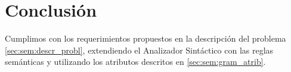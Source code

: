 

\section{Conclusión}
Cumplimos con los requerimientos propuestos en la descripción del problema \ref{sec:sem:descr_probl}, extendiendo el Analizador Sintáctico con las reglas semánticas y utilizando los atributos descritos en \ref{sec:sem:gram_atrib}. 
